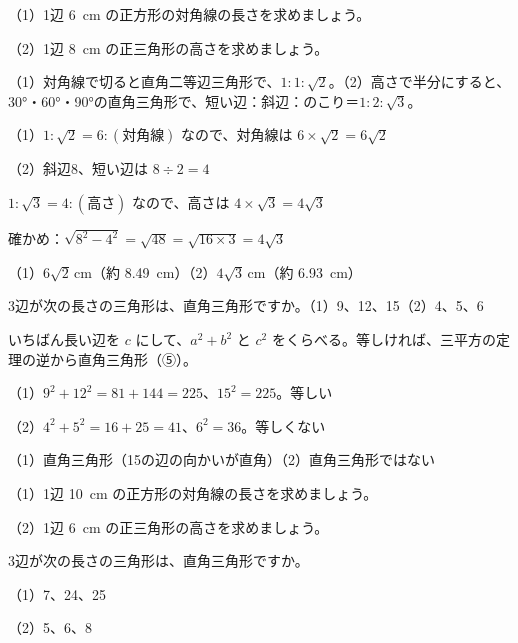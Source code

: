 \begin{reidai}[三角定規の比を使う]
（1）1辺 \qty{6}{cm} の正方形の対角線の長さを求めましょう。\par
（2）1辺 \qty{8}{cm} の正三角形の高さを求めましょう。\par
\kangaekata（1）対角線で切ると直角二等辺三角形で、$1:1:\sqrt2$。（2）高さで半分にすると、30°・60°・90°の直角三角形で、短い辺：斜辺：のこり＝$1:2:\sqrt3$。\par
\shiki（1）$1:\sqrt2=6:(\text{対角線})$ なので、対角線は $6\times\sqrt2=6\sqrt2$\par
\hspace*{2.6\zw}（2）斜辺8、短い辺は $8\div2=4$\par
\hspace*{4.6\zw}$1:\sqrt3=4:(\text{高さ})$ なので、高さは $4\times\sqrt3=4\sqrt3$\par
\hspace*{4.6\zw}確かめ：$\sqrt{8^2-4^2}=\sqrt{48}=\sqrt{16\times3}=4\sqrt3$\par
\kotae（1）$6\sqrt2$\,cm（約 \qty{8.49}{cm}）\quad（2）$4\sqrt3$\,cm（約 \qty{6.93}{cm}）
\end{reidai}

\begin{reidai}[直角三角形かどうかを見分ける]
3辺が次の長さの三角形は、直角三角形ですか。\quad（1）9、12、15\quad（2）4、5、6\par
\kangaekata いちばん長い辺を $c$ にして、$a^2+b^2$ と $c^2$ をくらべる。等しければ、三平方の定理の逆から直角三角形（⑤）。\par
\shiki（1）$9^2+12^2=81+144=225$、$15^2=225$。等しい\par
\hspace*{2.6\zw}（2）$4^2+5^2=16+25=41$、$6^2=36$。等しくない\par
\kotae（1）直角三角形（15の辺の向かいが直角）\quad（2）直角三角形ではない
\end{reidai}

\noindent\begin{minipage}[t]{0.485\linewidth}\vspace{0pt}\raggedright
\begin{jibun}\raggedright
（1）1辺 \qty{10}{cm} の正方形の対角線の長さを求めましょう。\par
（2）1辺 \qty{6}{cm} の正三角形の高さを求めましょう。
\end{jibun}
\end{minipage}\hfill
\begin{minipage}[t]{0.485\linewidth}\vspace{0pt}\raggedright
\begin{jibun}\raggedright
3辺が次の長さの三角形は、直角三角形ですか。\par（1）7、24、25\par（2）5、6、8
\end{jibun}
\end{minipage}

